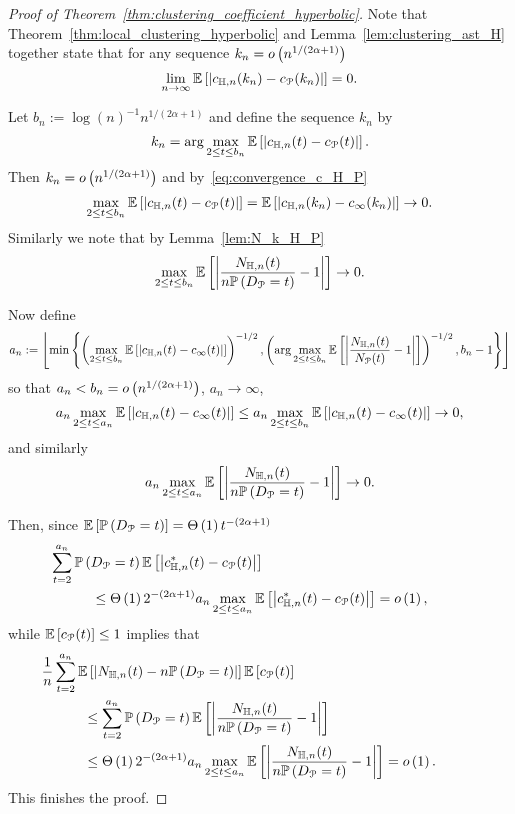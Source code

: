 \begin{proof}[Proof of Theorem~\ref{thm:clustering_coefficient_hyperbolic}]
Note that Theorem~\ref{thm:local_clustering_hyperbolic} and Lemma~\ref{lem:clustering_ast_H} together state that for any sequence $k_n  = o\left(n^{1/(2\alpha + 1)}\right)$
\begin{equation}\label{eq:convergence_c_H_P}
	\lim_{n \to \infty} \mathbb{E}\left[\left|c_{\mathbb{H},n}(k_n) - c_{{\mathcal P}}(k_n)\right|\right] = 0.
\end{equation}

Let $b_n := \log(n)^{-1} n^{1/(2\alpha + 1)}$ and define the sequence $k_n$ by
\[
	k_n = \arg \max_{2 \le t \le b_n} \mathbb{E}\left[\left|c_{\mathbb{H},n}(t) - c_{{\mathcal P}}(t)\right|\right].
\]
Then $k_n = o\left(n^{1/(2\alpha + 1)}\right)$ and by~\eqref{eq:convergence_c_H_P}
\[
	\max_{2 \le t \le b_n} \mathbb{E}\left[\left|c_{\mathbb{H},n}(t) - c_{{\mathcal P}}(t)\right|\right] = \mathbb{E}\left[\left|c_{\mathbb{H},n}(k_n) - c_{\infty}(k_n)\right|\right] \to 0.
\]
Similarly we note that by Lemma~\ref{lem:N_k_H_P}
\[
	\max_{2 \le t \le b_n} \mathbb{E}\left[\left|\frac{N_{\mathbb{H},n}(t)}{n \mathbb{P}\left(D_{{\mathcal P}} = t\right)} - 1\right|\right] \to 0.
\]

Now define
\[
	a_n := \left\lfloor \min \left\{
	\left(\max_{2 \le t \le b_n} \mathbb{E}\left[\left|c_{\mathbb{H},n}(t) - c_{\infty}(t)\right|\right]\right)^{-1/2},
	\left(\arg \max_{2 \le t \le b_n} \mathbb{E}\left[\left|\frac{N_{\mathbb{H},n}(t)}{N_{{\mathcal P}}(t)} - 1\right|\right]\right)^{-1/2},
	b_n - 1 \right\} \right\rfloor
\]
so that $a_n < b_n = o\left(n^{1/(2\alpha + 1)}\right)$, $a_n \to \infty$, 
\[
	a_n \max_{2 \le t \le a_n} \mathbb{E}\left[\left|c_{\mathbb{H},n}(t) - c_{\infty}(t)\right|\right] 
	\le a_n \max_{2 \le t \le b_n} \mathbb{E}\left[\left|c_{\mathbb{H},n}(t) - c_{\infty}(t)\right|\right] \to 0,
\]
and similarly
\[
	a_n \max_{2 \le t \le a_n} \mathbb{E}\left[\left|\frac{N_{\mathbb{H},n}(t)}{n \mathbb{P}\left(D_{{\mathcal P}} = t\right)} - 1\right|\right] \to 0.
\]

Then, since $\mathbb{E}\left[\mathbb{P}\left(D_{{\mathcal P}} = t\right)\right] = \Theta\left(1\right) t^{-(2\alpha + 1)}$
\begin{align*}
	&\hspace{-30pt}\sum_{t = 2}^{a_n} \Prob{D_\Pcal = t} \Exp{\left|c_{\H,n}^\ast(t) - c_{\Pcal}(t)\right|}\\
	&\le \bigT{1} 2^{-(2\alpha+1)} a_n \max_{2 \le t \le a_n} \Exp{\left|c_{\H,n}^\ast(t) - c_{\Pcal}(t)\right|}
	= \smallO{1},
\end{align*}
while $\mathbb{E}\left[c_{{\mathcal P}}(t)\right] \le 1$ implies that
\begin{align*}
	&\hspace{-30pt}\frac{1}{n} \sum_{t = 2}^{a_n} \Exp{\left|N_{\H,n}(t) - n \Prob{D_\Pcal = t}\right|}\Exp{c_\Pcal(t)} \\
	&\le \sum_{t = 2}^{a_n} \Prob{D_\Pcal = t} \Exp{\left|\frac{N_{\H,n}(t)}{n \Prob{D_\Pcal = t}} - 1\right|} \\
	&\le \bigT{1} 2^{-(2\alpha+1)} a_n \max_{2 \le t \le a_n} 
		\Exp{\left|\frac{N_{\H,n}(t)}{n \Prob{D_\Pcal = t}} - 1\right|} = \smallO{1}.
\end{align*}
This finishes the proof. %
\end{proof}